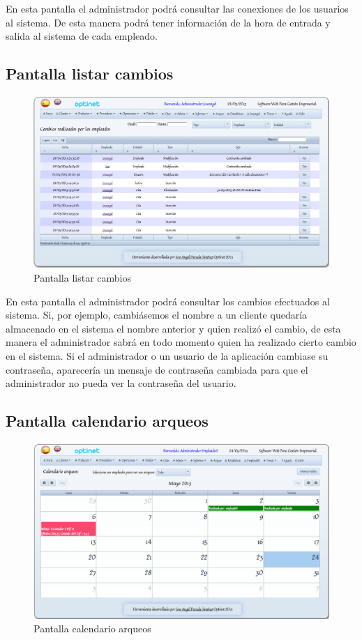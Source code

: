 \documentclass[a4paper,11pt]{book}
\begin{document}
En esta pantalla el administrador podrá consultar las conexiones de los usuarios al sistema. De esta manera podrá tener información de la hora de entrada y salida al sistema de cada empleado.

\newpage
\subsection {Pantalla listar cambios}

\begin{figure}[!htb]
  \centering
    \includegraphics[scale=0.35]{capcambios.png}
  \caption{Pantalla listar cambios}
  \label{a}
\end{figure}

En esta pantalla el administrador podrá consultar los cambios efectuados al sistema. Si, por ejemplo, cambiásemos el nombre a un cliente quedaría almacenado en el sistema el nombre anterior y quien realizó el cambio, de esta manera el administrador sabrá en todo momento quien ha realizado cierto cambio en el sistema. Si el administrador o un usuario de la aplicación cambiase su contraseña, aparecería un mensaje de contraseña cambiada para que el administrador no pueda ver la contraseña del usuario.

\newpage
\subsection {Pantalla calendario arqueos}

\begin{figure}[!htb]
  \centering
    \includegraphics[scale=0.35]{capcalendarioarqueos.png}
  \caption{Pantalla calendario arqueos}
  \label{a}
\end{figure}
\end{document}
